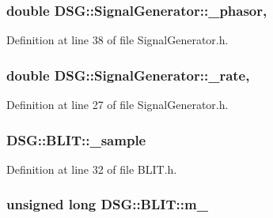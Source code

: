 \hypertarget{classDSG_1_1SignalGenerator_ac2271b582bf699275f077ecb642a8cd9}{
\subsubsection[{\+\_\+phasor}]{\setlength{\rightskip}{0pt plus 5cm}double D\+S\+G\+::\+Signal\+Generator\+::\+\_\+phasor\hspace{0.3cm}{\ttfamily [protected]}, {\ttfamily [inherited]}}}\label{classDSG_1_1SignalGenerator_ac2271b582bf699275f077ecb642a8cd9}


Definition at line 38 of file Signal\+Generator.\+h.

\hypertarget{classDSG_1_1SignalGenerator_aa10f6c85d9adee901139ea7fb346f39d}{
\subsubsection[{\+\_\+rate}]{\setlength{\rightskip}{0pt plus 5cm}double D\+S\+G\+::\+Signal\+Generator\+::\+\_\+rate\hspace{0.3cm}{\ttfamily [protected]}, {\ttfamily [inherited]}}}\label{classDSG_1_1SignalGenerator_aa10f6c85d9adee901139ea7fb346f39d}


Definition at line 27 of file Signal\+Generator.\+h.

\hypertarget{classDSG_1_1BLIT_a4fa5d5d8a8d5dd64e027067d0018570d}{
\subsubsection[{\+\_\+sample}]{ D\+S\+G\+::\+B\+L\+I\+T\+::\+\_\+sample\hspace{0.3cm}{\ttfamily [protected]}}}\label{classDSG_1_1BLIT_a4fa5d5d8a8d5dd64e027067d0018570d}


Definition at line 32 of file B\+L\+I\+T.\+h.

\hypertarget{classDSG_1_1BLIT_a93504a847d83314bbd9020750820242b}{
\subsubsection[{m\+\_\+}]{\setlength{\rightskip}{0pt plus 5cm}unsigned long D\+S\+G\+::\+B\+L\+I\+T\+::m\+\_\+\hspace{0.3cm}{\ttfamily [protected]}}}\label{classDSG_1_1BLIT_a93504a847d83314bbd9020750820242b}


